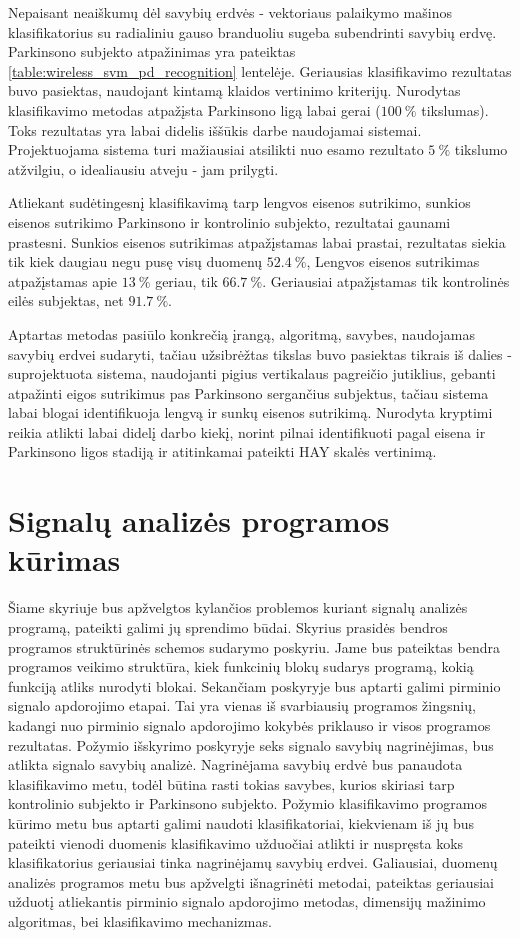 \documentclass[]{vgtuef}
\begin{document}
Nepaisant neaiškumų dėl savybių erdvės - vektoriaus palaikymo mašinos klasifikatorius su radialiniu gauso branduoliu sugeba subendrinti savybių erdvę. Parkinsono subjekto atpažinimas yra pateiktas \ref{table:wireless_svm_pd_recognition} lentelėje. Geriausias klasifikavimo rezultatas buvo pasiektas, naudojant kintamą klaidos vertinimo kriterijų. Nurodytas klasifikavimo metodas atpažįsta Parkinsono ligą labai gerai ($100~\%$ tikslumas). Toks rezultatas yra labai didelis iššūkis darbe naudojamai sistemai. Projektuojama sistema turi mažiausiai atsilikti nuo esamo rezultato $5~\%$ tikslumo atžvilgiu, o idealiausiu atveju - jam prilygti. 

Atliekant sudėtingesnį klasifikavimą tarp lengvos eisenos sutrikimo, sunkios eisenos sutrikimo Parkinsono  ir kontrolinio subjekto, rezultatai gaunami prastesni. Sunkios eisenos sutrikimas atpažįstamas labai prastai, rezultatas siekia tik kiek daugiau negu pusę visų duomenų $52.4~\%$, Lengvos eisenos sutrikimas atpažįstamas apie $13~\%$ geriau, tik $66.7~\%$. Geriausiai atpažįstamas tik kontrolinės eilės subjektas, net $91.7~\%$.

Aptartas metodas pasiūlo konkrečią įrangą, algoritmą, savybes, naudojamas savybių erdvei sudaryti, tačiau užsibrėžtas tikslas buvo pasiektas tikrais iš dalies - suprojektuota sistema, naudojanti pigius vertikalaus pagreičio jutiklius, gebanti atpažinti eigos sutrikimus pas Parkinsono sergančius subjektus, tačiau sistema labai blogai identifikuoja lengvą ir sunkų eisenos sutrikimą. Nurodyta kryptimi reikia atlikti labai didelį darbo kiekį, norint pilnai identifikuoti pagal eisena ir Parkinsono ligos stadiją ir atitinkamai pateikti HAY skalės vertinimą.

\section{Signalų analizės programos kūrimas}

Šiame skyriuje bus apžvelgtos kylančios problemos kuriant signalų analizės programą, pateikti galimi jų sprendimo būdai. Skyrius prasidės bendros programos struktūrinės schemos sudarymo poskyriu. Jame bus pateiktas bendra programos veikimo struktūra, kiek funkcinių blokų sudarys programą, kokią funkciją atliks nurodyti blokai. Sekančiam poskyryje bus aptarti galimi pirminio signalo apdorojimo etapai. Tai yra vienas iš svarbiausių programos žingsnių, kadangi nuo pirminio signalo apdorojimo kokybės priklauso ir visos programos rezultatas. Požymio išskyrimo poskyryje seks signalo savybių nagrinėjimas, bus atlikta signalo savybių analizė. Nagrinėjama savybių erdvė bus panaudota klasifikavimo metu, todėl būtina rasti tokias savybes, kurios skiriasi tarp kontrolinio subjekto ir Parkinsono subjekto. Požymio klasifikavimo programos kūrimo metu bus aptarti galimi naudoti klasifikatoriai, kiekvienam iš jų bus pateikti vienodi duomenis klasifikavimo užduočiai atlikti ir nuspręsta koks klasifikatorius geriausiai tinka nagrinėjamų savybių erdvei. Galiausiai, duomenų analizės programos metu bus apžvelgti išnagrinėti metodai, pateiktas geriausiai užduotį atliekantis pirminio signalo apdorojimo metodas, dimensijų mažinimo algoritmas, bei klasifikavimo mechanizmas.
\end{document}
